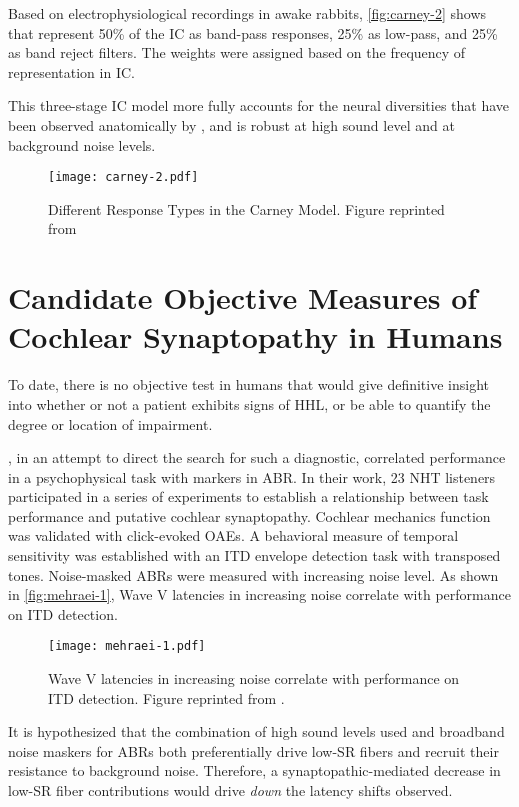 Based on electrophysiological recordings in awake rabbits, \autoref{fig:carney-2} shows that \citeauthor{Carney2015Speech} represent 50\% of the IC as band-pass responses, 25\% as low-pass, and 25\% as band reject filters.  The weights were assigned based on the frequency of representation in IC.  

This three-stage IC model more fully accounts for the neural diversities that have been observed anatomically by \cite{Beebe2016Extracellular}, and is robust at high sound level and at background noise levels. 

\begin{figure}[htbp]
	\centering
	\texttt{[image: carney-2.pdf]}
	\caption[IC Response Types]{Different Response Types in the Carney Model.  Figure reprinted from~\cite{Carney2015Speech}}
	\label{fig:carney-2}
\end{figure}

\section{Candidate Objective Measures of Cochlear Synaptopathy in Humans} %
\label{sec:objective_measures_of_cochlear_synaptopathy}
To date, there is no objective test in humans that would give definitive insight into whether or not a patient exhibits signs of HHL, or be able to quantify the degree or location of impairment. 

\cite{Mehraei2015Auditory}, in an attempt to direct the search for such a diagnostic, correlated performance in a psychophysical task with markers in ABR.  In their work, 23 NHT listeners participated in a series of experiments to establish a relationship between task performance and putative cochlear synaptopathy.   Cochlear mechanics function was validated with click-evoked OAEs.  A behavioral measure of temporal sensitivity was established with an ITD envelope detection task with transposed tones.  Noise-masked ABRs were measured with increasing noise level.   As shown in \autoref{fig:mehraei-1}, Wave V latencies in increasing noise correlate with performance on ITD detection.

\begin{figure}[htbp]
	\centering
	\texttt{[image: mehraei-1.pdf]}
	\caption[Wave V latency in noise]{Wave V latencies in increasing noise correlate with performance on ITD detection.  Figure reprinted from \cite{Mehraei2016Auditory}.}
	\label{fig:mehraei-1}
\end{figure}

It is hypothesized that the combination of high sound levels used and broadband noise maskers for ABRs both preferentially drive low-SR fibers and recruit their resistance to background noise.  Therefore, a synaptopathic-mediated decrease in low-SR fiber contributions would drive \emph{down} the latency shifts observed.
